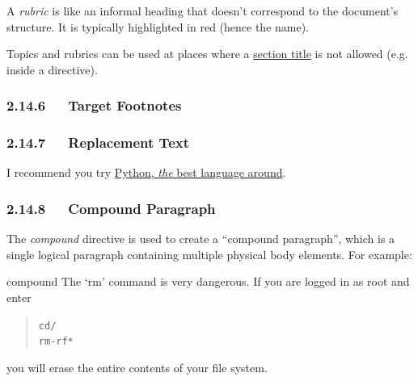 \documentclass[a4paper]{article}
\begin{document}
A \emph{rubric} is like an informal heading that doesn’t correspond to the
document’s structure. It is typically highlighted in red (hence the name).


Topics and rubrics can be used at places where a \hyperref[section-title]{section title} is not
allowed (e.g. inside a directive).


\subsubsection{2.14.6   Target Footnotes%
  \label{target-footnotes}%
}
%
%
%
%
%
%
%


\subsubsection{2.14.7   Replacement Text%
  \label{replacement-text}%
}

I recommend you try \href{http://www.python.org/}{Python, \emph{the} best language around}.


\subsubsection{2.14.8   Compound Paragraph%
  \label{compound-paragraph}%
}

The \emph{compound} directive is used to create a “compound paragraph”, which
is a single logical paragraph containing multiple physical body
elements. For example:

\begin{DUclass}{compound}
The ‘rm’ command is very dangerous.  If you are logged
in as root and enter
\begin{quote}
\begin{alltt}
cd /
rm -rf *
\end{alltt}
\end{quote}
you will erase the entire contents of your file system.
\end{DUclass}
\end{document}
